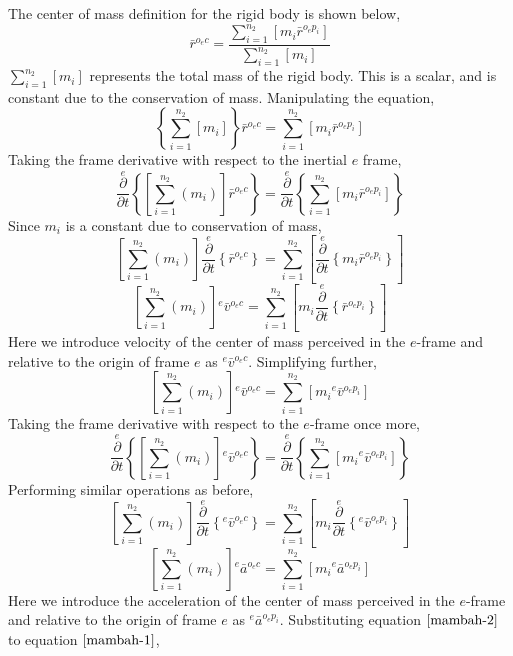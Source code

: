 \documentclass[class=report, 12pt, crop=false]{standalone}
\begin{document}
\begin{center}
The center of mass definition for the rigid body is shown below,
$$\bar{r}^{o_{e}c} = \frac{\displaystyle \sum^{n_{2}}_{i = 1}\left[m_{i}\bar{r}^{o_{e}p_{i}}\right]}{\displaystyle \sum^{n_{2}}_{i = 1}\left[m_{i}\right]}$$
$\displaystyle \sum^{n_{2}}_{i = 1}\left[m_{i}\right]$ represents the total mass of the rigid body. This is a scalar, and is constant due to the conservation of mass. Manipulating the equation,
$$\left\{\sum^{n_{2}}_{i = 1}\left[m_{i}\right]\right\}\bar{r}^{o_{e}c} = \sum^{n_{2}}_{i = 1}\left[m_{i}\bar{r}^{o_{e}p_{i}}\right]$$
Taking the frame derivative with respect to the inertial $e$ frame,
$$\overset{e}{\frac{\partial}{\partial t}}\left\{\left[\displaystyle \sum^{n_{2}}_{i = 1}\left(m_{i}\right)\right]\bar{r}^{o_{e}c}\right\} = \overset{e}{\frac{\partial}{\partial t}}\left\{\sum^{n_{2}}_{i = 1}\left[m_{i}\bar{r}^{o_{e}p_{i}}\right]\right\}$$
Since $m_{i}$ is a constant due to conservation of mass,
$$\left[\displaystyle \sum^{n_{2}}_{i = 1}\left(m_{i}\right)\right]\overset{e}{\frac{\partial}{\partial t}}\left\{\bar{r}^{o_{e}c}\right\} = \sum^{n_{2}}_{i = 1}\left[\overset{e}{\frac{\partial}{\partial t}}\left\{m_{i}\bar{r}^{o_{e}p_{i}}\right\}\right]$$
$$\left[\displaystyle \sum^{n_{2}}_{i = 1}\left(m_{i}\right)\right]{}^{e}\bar{v}^{o_{e}c} = \sum^{n_{2}}_{i = 1}\left[m_{i}\overset{e}{\frac{\partial}{\partial t}}\left\{\bar{r}^{o_{e}p_{i}}\right\}\right]$$
Here we introduce velocity of the center of mass perceived in the $e$-frame and relative to the origin of frame $e$ as ${}^{e}\bar{v}^{o_{e}c}$. Simplifying further,
$$\left[\sum^{n_{2}}_{i = 1}\left(m_{i}\right)\right]{}^{e}\bar{v}^{o_{e}c} = \sum^{n_{2}}_{i = 1}\left[m_{i}{}^{e}\bar{v}^{o_{e}p_{i}}\right]$$
Taking the frame derivative with respect to the $e$-frame once more,
$$\overset{e}{\frac{\partial}{\partial t}}\left\{\left[\sum^{n_{2}}_{i = 1}\left(m_{i}\right)\right]{}^{e}\bar{v}^{o_{e}c}\right\} = \overset{e}{\frac{\partial}{\partial t}}\left\{\sum^{n_{2}}_{i = 1}\left[m_{i}{}^{e}\bar{v}^{o_{e}p_{i}}\right]\right\}$$
Performing similar operations as before,
$$\left[\sum^{n_{2}}_{i = 1}\left(m_{i}\right)\right]\overset{e}{\frac{\partial}{\partial t}}\left\{{}^{e}\bar{v}^{o_{e}c}\right\} = \sum^{n_{2}}_{i = 1}\left[m_{i}\overset{e}{\frac{\partial}{\partial t}}\left\{{}^{e}\bar{v}^{o_{e}p_{i}}\right\}\right]$$
\begin{equation}\left[\sum^{n_{2}}_{i = 1}\left(m_{i}\right)\right]{}^{e}\bar{a}^{o_{e}c} = \sum^{n_{2}}_{i = 1}\left[m_{i}{}^{e}\bar{a}^{o_{e}p_{i}}\right]\label{mambah-2}\end{equation}
Here we introduce the acceleration of the center of mass perceived in the $e$-frame and relative to the origin of frame $e$ as ${}^{e}\bar{a}^{o_{e}p_{i}}$. Substituting equation $\ref{mambah-2}$ to equation $\ref{mambah-1}$,

\end{center}
\end{document}
